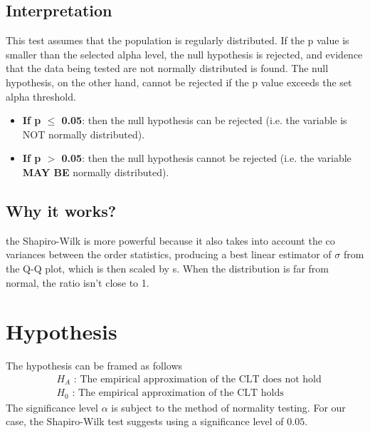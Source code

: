 \documentclass{article}
\begin{document}
\subsection{Interpretation}
This test assumes that the population is regularly distributed. If the p value is smaller than the selected alpha level, the null hypothesis is rejected, and evidence that the data being tested are not normally distributed is found. The null hypothesis, on the other hand, cannot be rejected if the p value exceeds the set alpha threshold.
\begin{itemize}
    \item \textbf{If p $\leq$ 0.05}: then the null hypothesis can be rejected (i.e. the variable is NOT normally distributed).
    \item \textbf{If p $>$ 0.05}: then the null hypothesis cannot be rejected (i.e. the variable \textbf{MAY BE} normally distributed).
\end{itemize}

\subsection{Why it works?}
the Shapiro-Wilk is more powerful because it also takes into account the co variances between the order statistics, producing a best linear estimator of $\sigma$ from the Q-Q plot, which is then scaled by s. When the distribution is far from normal, the ratio isn't close to 1.



\section{Hypothesis}
The hypothesis can be framed as follows
\begin{align}
    & H_A\text{ : The empirical approximation of the CLT does not hold} \nonumber\\
    & H_0\text{ : The empirical approximation of the CLT holds}\nonumber
\end{align}
The significance level $\alpha$ is subject to the method of normality testing. For our case, the Shapiro-Wilk test suggests using a significance level of $0.05$. 
\end{document}
